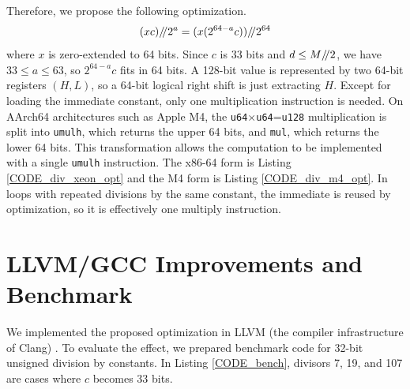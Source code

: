\documentclass{article}
\begin{document}

Therefore, we propose the following optimization.
$$(xc) {\mathbin{/\mkern-4mu/}} 2^a=(x(2^{64-a}c)) {\mathbin{/\mkern-4mu/}} 2^{64}$$
where $x$ is zero-extended to 64 bits.
Since $c$ is 33 bits and $d \le M {\mathbin{/\mkern-4mu/}} 2$, we have $33 \le a \le 63$, so $2^{64-a}c$ fits in 64 bits.
A 128-bit value is represented by two 64-bit registers $(H, L)$, so a 64-bit logical right shift is just extracting $H$.
Except for loading the immediate constant, only one multiplication instruction is needed.
On AArch64 architectures such as Apple M4, the {\tt u64}×{\tt u64}={\tt u128} multiplication is split into {\tt umulh}, which returns the upper 64 bits, and {\tt mul}, which returns the lower 64 bits.
This transformation allows the computation to be implemented with a single {\tt umulh} instruction.
The x86-64 form is Listing \ref{CODE_div_xeon_opt} and the M4 form is Listing \ref{CODE_div_m4_opt}.
In loops with repeated divisions by the same constant, the immediate is reused by optimization, so it is effectively one multiply instruction.





\section{LLVM/GCC Improvements and Benchmark}
We implemented the proposed optimization in LLVM (the compiler infrastructure of Clang) \cite{LLVMopt}.
To evaluate the effect, we prepared benchmark code for 32-bit unsigned division by constants.
In Listing \ref{CODE_bench}, divisors 7, 19, and 107 are cases where $c$ becomes 33 bits.


\end{document}
